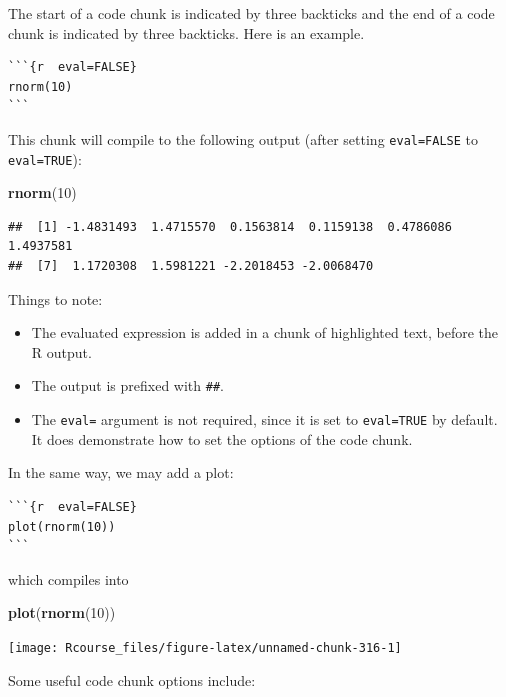 \documentclass[]{book}
\newenvironment{Shaded}{\begin{snugshade}}{\end{snugshade}}
\newcommand{\DecValTok}[1]{\textcolor[rgb]{0.00,0.00,0.81}{#1}}
\newcommand{\KeywordTok}[1]{\textcolor[rgb]{0.13,0.29,0.53}{\textbf{#1}}}
\newcommand{\NormalTok}[1]{#1}
\providecommand{\tightlist}{%
  \setlength{\itemsep}{0pt}\setlength{\parskip}{0pt}}
\theoremstyle{definition}
\theoremstyle{definition}
\theoremstyle{definition}
\theoremstyle{remark}
\begin{document}
The start of a code chunk is indicated by three backticks and the end of a code chunk is indicated by three backticks.
Here is an example.

\begin{verbatim}
```{r  eval=FALSE}
rnorm(10)
```
\end{verbatim}

This chunk will compile to the following output (after setting \texttt{eval=FALSE} to \texttt{eval=TRUE}):

\begin{Shaded}
\begin{Highlighting}[]
\KeywordTok{rnorm}\NormalTok{(}\DecValTok{10}\NormalTok{)}
\end{Highlighting}
\end{Shaded}

\begin{verbatim}
##  [1] -1.4831493  1.4715570  0.1563814  0.1159138  0.4786086  1.4937581
##  [7]  1.1720308  1.5981221 -2.2018453 -2.0068470
\end{verbatim}

Things to note:

\begin{itemize}
\tightlist
\item
  The evaluated expression is added in a chunk of highlighted text, before the R output.
\item
  The output is prefixed with \texttt{\#\#}.
\item
  The \texttt{eval=} argument is not required, since it is set to \texttt{eval=TRUE} by default. It does demonstrate how to set the options of the code chunk.
\end{itemize}

In the same way, we may add a plot:

\begin{verbatim}
```{r  eval=FALSE}
plot(rnorm(10))
```
\end{verbatim}

which compiles into

\begin{Shaded}
\begin{Highlighting}[]
\KeywordTok{plot}\NormalTok{(}\KeywordTok{rnorm}\NormalTok{(}\DecValTok{10}\NormalTok{))}
\end{Highlighting}
\end{Shaded}

\texttt{[image: Rcourse\_files/figure-latex/unnamed-chunk-316-1]}

Some useful code chunk options include:
\end{document}
